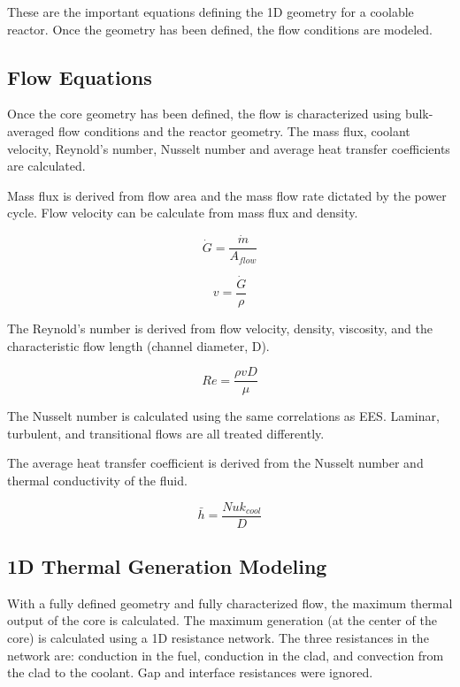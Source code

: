 These are the important equations defining the 1D geometry for a coolable
reactor. Once the geometry has been defined, the flow conditions are modeled.

\subsection{Flow Equations}

Once the core geometry has been defined, the flow is characterized using
bulk-averaged flow conditions and the reactor geometry. The mass flux, coolant
velocity, Reynold's number, Nusselt number and average heat transfer
coefficients are calculated.

Mass flux is derived from flow area and the mass flow rate dictated by the power
cycle. Flow velocity can be calculate from mass flux and density.

\begin{equation}
    \dot{G} = \frac{\dot{m}}{A_{flow}}
\end{equation}

\begin{equation}
    v = \frac{\dot{G}}{\rho}
\end{equation}

The Reynold's number is derived from flow velocity, density, viscosity, and the
characteristic flow length (channel diameter, D).

\begin{equation}
    Re = \frac{\rho v D}{\mu}
\end{equation}

The Nusselt number is calculated using the same correlations as EES. Laminar,
turbulent, and transitional flows are all treated differently.

The average heat transfer coefficient is derived from the Nusselt number and
thermal conductivity of the fluid.

\begin{equation}
    \bar{h} = \frac{Nu k_{cool}}{D}
\end{equation}

\subsection{1D Thermal Generation Modeling}

With a fully defined geometry and fully characterized flow, the maximum thermal
output of the core is calculated. The maximum generation (at the center of the
core) is calculated using a 1D resistance network. The three resistances in the
network are: conduction in the fuel, conduction in the clad, and convection from
the clad to the coolant. Gap and interface resistances were ignored.

